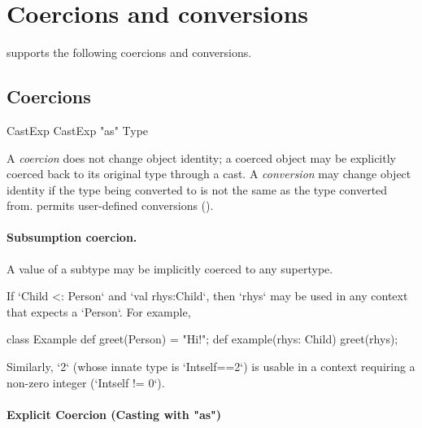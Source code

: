 \section{Coercions and conversions}
\label{XtenConversions}
\label{User-definedCoercions}

\XtenCurrVer{} supports the following coercions and conversions.

\subsection{Coercions}

\begin{bbgrammar}
             CastExp \: CastExp \xcd"as" Type \\
\end{bbgrammar}


A {\em coercion} does not change object identity; a coerced object may
be explicitly coerced back to its original type through a cast. A {\em
  conversion} may change object identity if the type being converted
to is not the same as the type converted from. \Xten{} permits
user-defined conversions ().

\paragraph{Subsumption coercion.}
A value of a subtype may be implicitly coerced to any supertype.  

\begin{ex}
If \xcd`Child <: Person` and \xcd`val rhys:Child`, then \xcd`rhys` may be used
in any context that expects a \xcd`Person`.  For example, 
\begin{xten}
class Example {
  def greet(Person) = "Hi!";
  def example(rhys: Child) {
     greet(rhys);
  }
}
\end{xten}
%

Similarly, \xcd`2` (whose innate type is \xcd`Int{self==2}`)
is usable in a context requiring a non-zero integer
(\xcd`Int{self != 0}`).  
\end{ex}

\paragraph{Explicit Coercion (Casting with \xcd"as")}

